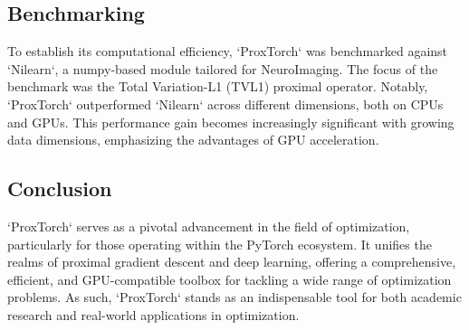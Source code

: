 \subsection{Benchmarking}

To establish its computational efficiency, `ProxTorch` was benchmarked against `Nilearn`, a numpy-based module tailored for NeuroImaging.
The focus of the benchmark was the Total Variation-L1 (TVL1) proximal operator.
Notably, `ProxTorch` outperformed `Nilearn` across different dimensions, both on CPUs and GPUs. This performance gain becomes increasingly significant with growing data dimensions, emphasizing the advantages of GPU acceleration.

\subsection{Conclusion}

`ProxTorch` serves as a pivotal advancement in the field of optimization, particularly for those operating within the PyTorch ecosystem.
It unifies the realms of proximal gradient descent and deep learning, offering a comprehensive, efficient, and GPU-compatible toolbox for tackling a wide range of optimization problems.
As such, `ProxTorch` stands as an indispensable tool for both academic research and real-world applications in optimization.



